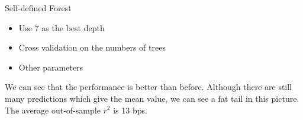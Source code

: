 \documentclass{beamer}
\begin{document}
\begin{frame}{Self-defined Forest}
\begin{itemize}
    \item Use 7 as the best depth
    \item Cross validation on the numbers of trees
    \item Other parameters
\end{itemize}

\begin{figure}[htbp]


\end{figure}
We can see that the performance is better than before. Although there are still many predictions which give the mean value, we can see a fat tail in this picture. The average out-of-sample $r^2$ is 13 bps. 
\end{frame}
\end{document}
